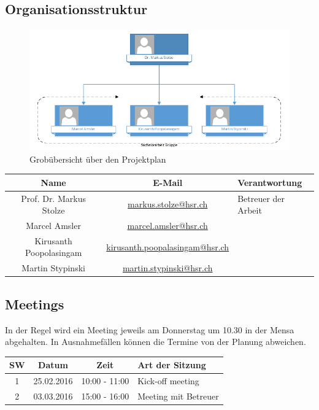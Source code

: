 \subsection{Organisationsstruktur}
\begin{figure}[ht]
	\centering
	\includegraphics[width=\textwidth]{images/organigram.png}
	\caption{Grobübersicht über den Projektplan}
	\label{Risk result}
\end{figure}
\noindent
\begin{tabularx}{\textwidth}{|c|c|X|}
  \hline
  \textbf{Name} & \textbf{E-Mail} & \textbf{Verantwortung} \\
  \hline \hline
  Prof. Dr. Markus Stolze & \url{markus.stolze@hsr.ch} & Betreuer der Arbeit\\
  \hline \hline
  Marcel Amsler & \url{marcel.amsler@hsr.ch} & \\
  \hline
  Kirusanth Poopolasingam & \url{kirusanth.poopalasingam@hsr.ch} & \\
  \hline
  Martin Stypinski & \url{martin.stypinski@hsr.ch} & \\
  \hline
\end{tabularx}
\subsection{Meetings}
In der Regel wird ein Meeting jeweils am Donnerstag um 10.30 in der Mensa abgehalten. In Ausnahmefällen können die Termine von der Planung abweichen.
  \\[1\normalbaselineskip]
\begin{tabularx}{\textwidth}{|c|c|c|X|}
  \hline
  \textbf{SW} & \textbf{Datum} & \textbf{Zeit} & \textbf{Art der Sitzung} \\
  \hline \hline
  1 & 25.02.2016 & 10:00 - 11:00 &  Kick-off meeting \\
  2 & 03.03.2016 & 15:00 - 16:00 &  Meeting mit Betreuer \\
  \hline
\end{tabularx}
\newpage
